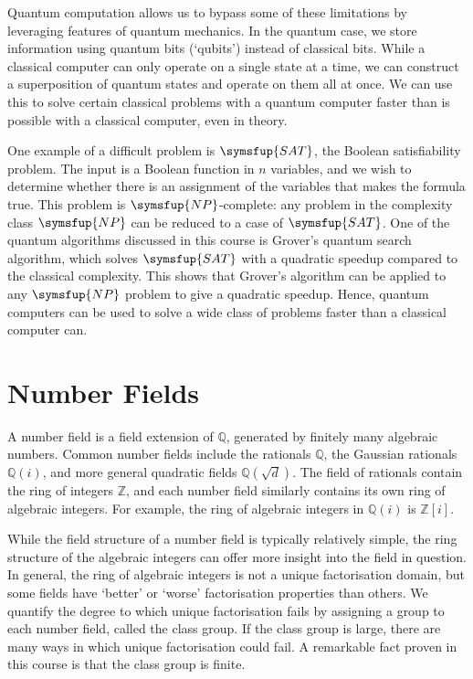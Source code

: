 Quantum computation allows us to bypass some of these limitations by leveraging features of quantum mechanics.
In the quantum case, we store information using quantum bits (`qubits') instead of classical bits.
While a classical computer can only operate on a single state at a time, we can construct a superposition of quantum states and operate on them all at once.
We can use this to solve certain classical problems with a quantum computer faster than is possible with a classical computer, even in theory.

One example of a difficult problem is \( \symsfup{SAT} \), the Boolean satisfiability problem.
The input is a Boolean function in \( n \) variables, and we wish to determine whether there is an assignment of the variables that makes the formula true.
This problem is \( \symsfup{NP} \)-complete: any problem in the complexity class \( \symsfup{NP} \) can be reduced to a case of \( \symsfup{SAT} \).
One of the quantum algorithms discussed in this course is Grover's quantum search algorithm, which solves \( \symsfup{SAT} \) with a quadratic speedup compared to the classical complexity.
This shows that Grover's algorithm can be applied to any \( \symsfup{NP} \) problem to give a quadratic speedup.
Hence, quantum computers can be used to solve a wide class of problems faster than a classical computer can.



\chapter{Number Fields}
A number field is a field extension of \( \mathbb Q \), generated by finitely many algebraic numbers.
Common number fields include the rationals \( \mathbb Q \), the Gaussian rationals \( \mathbb Q(i) \), and more general quadratic fields \( \mathbb Q(\sqrt{d}) \).
The field of rationals contain the ring of integers \( \mathbb Z \), and each number field similarly contains its own ring of algebraic integers.
For example, the ring of algebraic integers in \( \mathbb Q(i) \) is \( \mathbb Z[i] \).

While the field structure of a number field is typically relatively simple, the ring structure of the algebraic integers can offer more insight into the field in question.
In general, the ring of algebraic integers is not a unique factorisation domain, but some fields have `better' or `worse' factorisation properties than others.
We quantify the degree to which unique factorisation fails by assigning a group to each number field, called the class group.
If the class group is large, there are many ways in which unique factorisation could fail.
A remarkable fact proven in this course is that the class group is finite.

